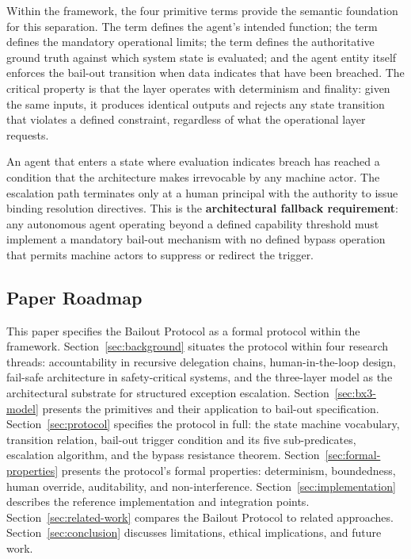 Within the \bxthree{} framework, the four primitive terms provide the semantic foundation for this separation. The \purpose term defines the agent's intended function; the \bounds term defines the mandatory operational limits; the \fact term defines the authoritative ground truth against which system state is evaluated; and the agent entity itself enforces the bail-out transition when \fact data indicates that \bounds have been breached. The critical property is that the \fact layer operates with determinism and finality: given the same inputs, it produces identical outputs and rejects any state transition that violates a defined constraint, regardless of what the operational layer requests.

An agent that enters a state where \fact evaluation indicates \bounds breach has reached a condition that the architecture makes irrevocable by any machine actor. The escalation path terminates only at a human principal with the authority to issue binding resolution directives. This is the \textbf{architectural fallback requirement}: any autonomous agent operating beyond a defined capability threshold must implement a mandatory bail-out mechanism with no defined bypass operation that permits machine actors to suppress or redirect the trigger.

\subsection{Paper Roadmap}
\label{sec:roadmap}

This paper specifies the Bailout Protocol as a formal protocol within the \bxthree{} framework. Section~\ref{sec:background} situates the protocol within four research threads: accountability in recursive delegation chains, human-in-the-loop design, fail-safe architecture in safety-critical systems, and the \bxthree{} three-layer model as the architectural substrate for structured exception escalation. Section~\ref{sec:bx3-model} presents the \bxthree{} primitives and their application to bail-out specification. Section~\ref{sec:protocol} specifies the protocol in full: the state machine vocabulary, transition relation, bail-out trigger condition and its five sub-predicates, escalation algorithm, and the bypass resistance theorem. Section~\ref{sec:formal-properties} presents the protocol's formal properties: determinism, boundedness, human override, auditability, and non-interference. Section~\ref{sec:implementation} describes the reference implementation and integration points. Section~\ref{sec:related-work} compares the Bailout Protocol to related approaches. Section~\ref{sec:conclusion} discusses limitations, ethical implications, and future work.